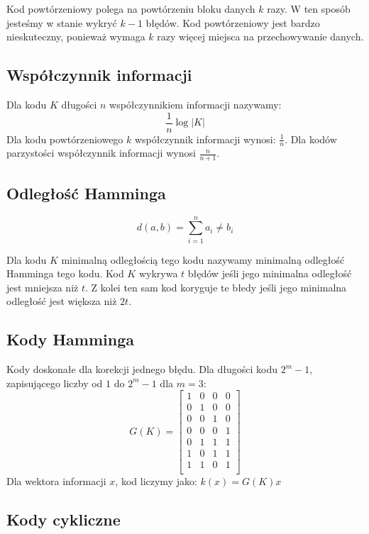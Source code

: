 \documentclass{../notatki}
\begin{document}
Kod powtórzeniowy polega na powtórzeniu bloku danych $k$ razy. W ten sposób
jesteśmy w stanie wykryć $k-1$ błędów. Kod powtórzeniowy jest bardzo
nieskuteczny, ponieważ wymaga $k$ razy więcej miejsca na przechowywanie
danych.

\subsection{Współczynnik informacji}

Dla kodu $K$ długości $n$ współczynnikiem informacji nazywamy:
$$
\frac{1}{n}\log|K|
$$
Dla kodu powtórzeniowego $k$ współczynnik informacji wynosi: $\frac{1}{n}$.
Dla kodów parzystości współczynnik informacji wynosi $\frac{n}{n+1}$.

\subsection{Odległość Hamminga}

$$
d(a, b) = \sum_{i = 1}^{n} a_i \ne b_i
$$

Dla kodu $K$ minimalną odległością tego kodu nazywamy minimalną odległość
Hamminga tego kodu. Kod $K$ wykrywa $t$ błędów jeśli jego minimalna odległość
jest mniejsza niż $t$. Z kolei ten sam kod koryguje te błedy jeśli jego
minimalna odległość jest większa niż $2t$.

\subsection{Kody Hamminga}

Kody doskonałe dla korekcji jednego błędu.
Dla długości kodu $2^m - 1$, zapisującego liczby od $1$ do $2^m-1$ dla $m=3$:
$$
G(K) =
\begin{bmatrix}
  1 & 0 & 0 & 0 \\
  0 & 1 & 0 & 0 \\
  0 & 0 & 1 & 0 \\
  0 & 0 & 0 & 1 \\
  0 & 1 & 1 & 1 \\
  1 & 0 & 1 & 1 \\
  1 & 1 & 0 & 1 \\
\end{bmatrix}
$$
Dla wektora informacji $x$, kod liczymy jako: $k(x) = G(K)x$

\subsection{Kody cykliczne}
\end{document}
